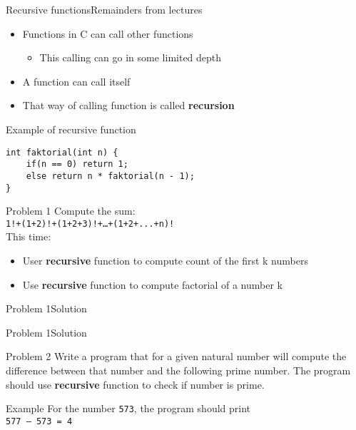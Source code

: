 


\begin{frame}[fragile]{Recursive functions}{Remainders from lectures}
\begin{itemize}
    \item Functions in C can call other functions
    \begin{itemize}
        \item This calling can go in some limited depth
    \end{itemize}    
    \item A function can call itself
    \item That way of calling function is called \textbf{recursion}    
\end{itemize}
\begin{exampleblock}{Example of recursive function}
\begin{lstlisting}
int faktorial(int n) {
    if(n == 0) return 1;
    else return n * faktorial(n - 1);
}
\end{lstlisting}
\end{exampleblock}
\end{frame}

\begin{frame}{Problem 1}
Compute the sum:\\
\texttt{1!+(1+2)!+(1+2+3)!+\ldots+(1+2+...+n)!}
\\This time:\\
\begin{itemize}
    \item User \textbf{recursive} function to compute count of the first
    k numbers
    \item Use \textbf{recursive} function to compute factorial of a number k
\end{itemize}
\end{frame}

\begin{frame}[fragile]{Problem 1}{Solution}

\end{frame}

\begin{frame}[fragile]{Problem 1}{Solution}

\end{frame}


\begin{frame}{Problem 2}
Write a program that for a given natural number will compute the difference
between that number and the following prime number. The program should use
\textbf{recursive} function to check if number is prime.
\begin{exampleblock}{Example}
For the number \texttt{573}, the program should print\\
\texttt{577 – 573 = 4}
\end{exampleblock}
\end{frame}

